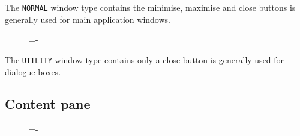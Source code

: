 \documentclass[a4paper]{systems-software}
\begin{document}
The \texttt{NORMAL} window type contains the minimise, maximise and close buttons is generally used for main application windows.

\begin{figure}[H]
	\lineskip=-\fboxrule
\end{figure}

The \texttt{UTILITY} window type contains only a close button is generally used for dialogue boxes.

\newpage

\subsection*{Content pane}

\begin{figure}[H]
	\lineskip=-\fboxrule
\end{figure}
\end{document}
